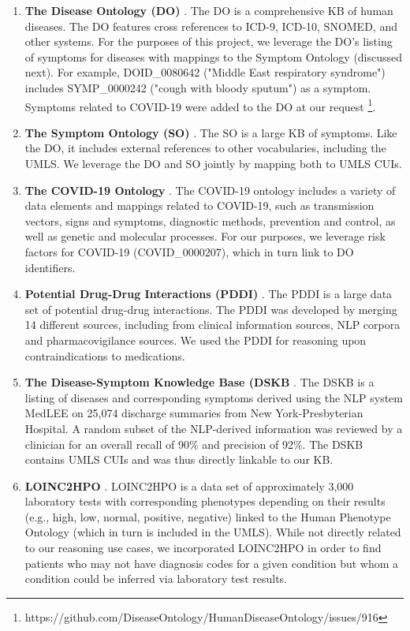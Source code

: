 \documentclass[../main.tex]{subfiles}
\begin{document}
\begin{enumerate}
    \item \textbf{The Disease Ontology (DO)} \cite{schriml2012disease}. The DO is a comprehensive KB of human diseases. The DO features cross references to ICD-9, ICD-10, SNOMED, and other systems. For the purposes of this project, we leverage the DO's listing of symptoms for diseases with mappings to the Symptom Ontology (discussed next). For example, DOID\_0080642 ("Middle East respiratory syndrome") includes SYMP\_0000242 ("cough with bloody sputum") as a symptom. Symptoms related to COVID-19 were added to the DO at our request \footnote{https://github.com/DiseaseOntology/HumanDiseaseOntology/issues/916}.
    \item \textbf{The Symptom Ontology (SO)} \cite{sayers2010database}. The SO is a large KB of symptoms. Like the DO, it includes external references to other vocabularies, including the UMLS. We leverage the DO and SO jointly by mapping both to UMLS CUIs.
    \item \textbf{The COVID-19 Ontology} \cite{sargsyan2020covid}. The COVID-19 ontology includes a variety of data elements and mappings related to COVID-19, such as transmission vectors, signs and symptoms, diagnostic methods, prevention and control, as well as genetic and molecular processes. For our purposes, we leverage risk factors for COVID-19 (COVID\_0000207), which in turn link to DO identifiers.
    \item \textbf{Potential Drug-Drug Interactions (PDDI)} \cite{ayvaz2015toward}. The PDDI is a large data set of potential drug-drug interactions. The PDDI was developed by merging 14 different sources, including from clinical information sources, NLP corpora and pharmacovigilance sources. We used the PDDI for reasoning upon contraindications to medications.
    \item \textbf{The Disease-Symptom Knowledge Base (DSKB} \cite{wang2008automated}. The DSKB is a listing of diseases and corresponding symptoms derived using the NLP system MedLEE \cite{friedman1994general} on 25,074 discharge summaries from New York-Presbyterian Hospital. A random subset of the NLP-derived information was reviewed by a clinician for an overall recall of 90\% and precision of 92\%. The DSKB contains UMLS CUIs and was thus directly linkable to our KB. 
    \item \textbf{LOINC2HPO} \cite{zhang2019semantic}. LOINC2HPO is a data set of approximately 3,000 laboratory tests with corresponding phenotypes depending on their results (e.g., high, low, normal, positive, negative) linked to the Human Phenotype Ontology (which in turn is included in the UMLS). While not directly related to our reasoning use cases, we incorporated LOINC2HPO in order to find patients who may not have diagnosis codes for a given condition but whom a condition could be inferred via laboratory test results.
\end{enumerate}
\end{document}
